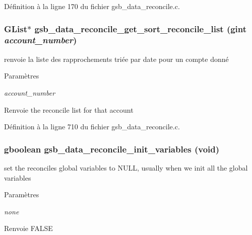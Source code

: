 Définition à la ligne 170 du fichier gsb\_\-data\_\-reconcile.c.

\subsubsection[{gsb\_\-data\_\-reconcile\_\-get\_\-sort\_\-reconcile\_\-list}]{\setlength{\rightskip}{0pt plus 5cm}GList$\ast$ gsb\_\-data\_\-reconcile\_\-get\_\-sort\_\-reconcile\_\-list (gint {\em account\_\-number})}\label{gsb__data__reconcile_8h_a8224c264d9596777a0a701a31bd2487f}
renvoie la liste des rapprochements triée par date pour un compte donné


\begin{DoxyParams}{Paramètres}
\item[{\em account\_\-number}]\end{DoxyParams}
\begin{DoxyReturn}{Renvoie}
the reconcile list for that account 
\end{DoxyReturn}


Définition à la ligne 710 du fichier gsb\_\-data\_\-reconcile.c.

\subsubsection[{gsb\_\-data\_\-reconcile\_\-init\_\-variables}]{\setlength{\rightskip}{0pt plus 5cm}gboolean gsb\_\-data\_\-reconcile\_\-init\_\-variables (void)}\label{gsb__data__reconcile_8h_a92e5a9c9c1a907d6b2f7571426a910b6}
set the reconciles global variables to NULL, usually when we init all the global variables


\begin{DoxyParams}{Paramètres}
\item[{\em none}]\end{DoxyParams}
\begin{DoxyReturn}{Renvoie}
FALSE 
\end{DoxyReturn}


